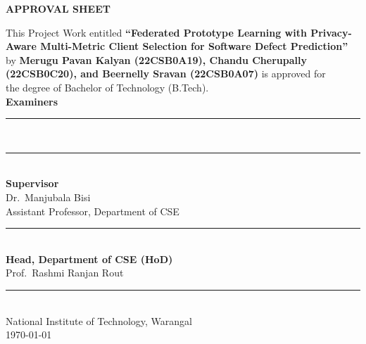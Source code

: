 

\begin{titlepage}
   \begin{center}
       \textbf{\huge{APPROVAL SHEET}}

       \vspace{1.3cm}
        This Project Work entitled \textbf{``Federated Prototype Learning with Privacy-Aware Multi-Metric Client Selection for Software Defect Prediction''} by \textbf{Merugu Pavan Kalyan (22CSB0A19), Chandu Cherupally (22CSB0C20), and Beernelly Sravan (22CSB0A07)} is approved for\\
        \vspace{0.4cm}
        the degree of Bachelor of Technology (B.Tech).\\
        \vspace{0.4cm}
        \textbf{Examiners}\\
        \vspace{0.4cm}
        \vspace{1.3cm}
        \par\noindent\rule{0.5\textwidth}{0.4pt}
        \\
        \vspace{0.8cm}
        \par\noindent\rule{0.5\textwidth}{0.4pt}
        \\
       \vspace{1.1cm}
       \textbf{Supervisor}\\
       \vspace{0.4cm}
       Dr.~Manjubala Bisi\\
       Assistant Professor, Department of CSE\\
       \vspace{0.6cm}
       \par\noindent\rule{0.5\textwidth}{0.4pt} \\
       \vspace{1.3cm}
       \textbf{Head, Department of CSE (HoD)}\\
       \vspace{0.4cm}
       Prof.~Rashmi Ranjan Rout\\
       \vspace{0.5cm}
       \par\noindent\rule{0.5\textwidth}{0.4pt} \\
       \vspace{0.5cm}
       National Institute of Technology, Warangal
       \\
       \vspace{0.4cm}
       \today
   \end{center}
\end{titlepage}
